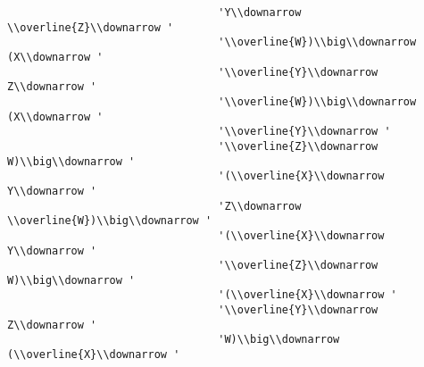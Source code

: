 \begin{verbatim}
                                 'Y\\downarrow \\overline{Z}\\downarrow '
                                 '\\overline{W})\\big\\downarrow (X\\downarrow '
                                 '\\overline{Y}\\downarrow Z\\downarrow '
                                 '\\overline{W})\\big\\downarrow (X\\downarrow '
                                 '\\overline{Y}\\downarrow '
                                 '\\overline{Z}\\downarrow W)\\big\\downarrow '
                                 '(\\overline{X}\\downarrow Y\\downarrow '
                                 'Z\\downarrow \\overline{W})\\big\\downarrow '
                                 '(\\overline{X}\\downarrow Y\\downarrow '
                                 '\\overline{Z}\\downarrow W)\\big\\downarrow '
                                 '(\\overline{X}\\downarrow '
                                 '\\overline{Y}\\downarrow Z\\downarrow '
                                 'W)\\big\\downarrow (\\overline{X}\\downarrow '

\end{verbatim}

